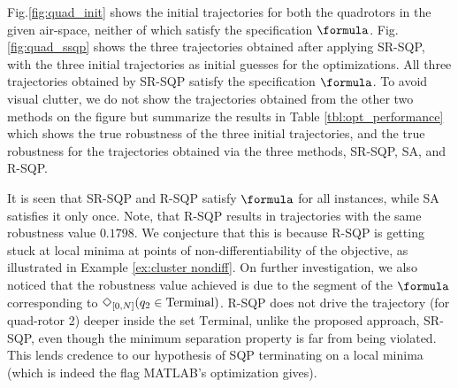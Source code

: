 Fig.\ref{fig:quad_init} shows the initial trajectories for both the quadrotors in the given air-space, neither of which satisfy the specification $\formula$. 
Fig.\ref{fig:quad_ssqp} shows the three trajectories obtained after applying SR-SQP,
with the three initial trajectories as initial guesses for the optimizations. 
All three trajectories obtained by SR-SQP satisfy the specification $\formula$. To avoid visual clutter, we do not show the trajectories obtained from the other two methods on the figure but summarize the results in Table \ref{tbl:opt_performance} which shows the true robustness of the three initial trajectories, and the true robustness for the trajectories obtained via the three methods, SR-SQP, SA, and R-SQP.

It is seen that SR-SQP and R-SQP satisfy $\formula$ for all instances, while SA satisfies it only once.
Note, that R-SQP results in trajectories with the same robustness value $0.1798$. 
We conjecture that this is because R-SQP is getting stuck at local minima at points of non-differentiability of the objective, as illustrated in Example \ref{ex:cluster nondiff}.
On further investigation, we also noticed that the robustness value achieved is due to the segment of the $\formula$ corresponding to $\Diamond_{[0,N]}(q_2 \in \text{Terminal})$. R-SQP does not drive the trajectory (for quad-rotor 2) deeper inside the set $\text{Terminal}$, unlike the proposed approach, SR-SQP, even though the minimum separation property is far from being violated. This lends credence to our hypothesis of SQP terminating on a local minima (which is indeed the flag MATLAB's optimization gives).

